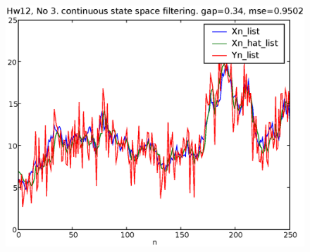 \documentclass[a4paper,10pt]{article}
\begin{document}
\begin{figure}
\includegraphics[width=1\textwidth]{hw12_3_gap_0_34.eps}
\caption{}\label{f2}
\end{figure}
\end{document}
